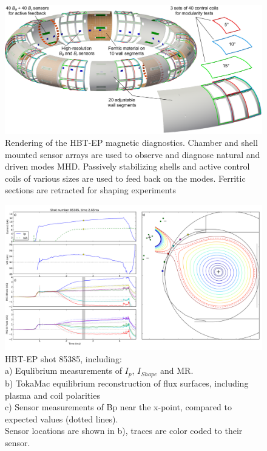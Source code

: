 \documentclass[aps,prl,twocolumn,superscriptaddress,groupedaddress]{revtex4}  %
\begin{document}
\begin{figure}[htb]
	\centering
	\includegraphics[scale=.25]{../Plots/Plasma_with_sensors_FWall_concept_WithCCview.png}
	\caption{Rendering of the HBT-EP magnetic diagnostics.  Chamber and shell mounted sensor arrays are used to observe and diagnose natural and driven modes MHD.  Passively stabilizing shells and active control coils of various sizes are used to feed back on the modes.  Ferritic sections are retracted for shaping experiments}
	\label{schematic}
	\end{figure}
	
\begin{figure}[t]
	\centering
\includegraphics[scale=.4]{../Plots/shot_85388_currents_fields_fluxes_better_aspect_ratio_polarity.png}\caption{HBT-EP shot 85385, including: \\a) Equlibrium measurements of $I_p$, $I_{Shape}$ and MR.\\  b) TokaMac equilibrium reconstruction of flux surfaces, including plasma and coil polarities\\c) Sensor measurements of Bp near the x-point, compared to expected values (dotted lines).\\  Sensor locations are shown in b), traces are color coded to their sensor.\\}
	\label{fluxes and fields}
\end{figure}
\end{document}
